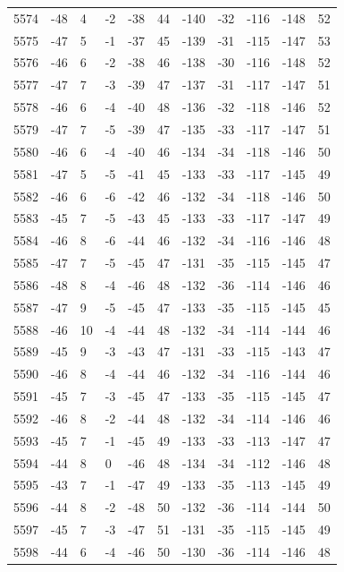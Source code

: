 \begin{table}[H]
\begin{tabular}{lllllllllll}
5574 & -48 & 4 & -2 & -38 & 44 & -140 & -32 & -116 & -148 & 52 \\
5575 & -47 & 5 & -1 & -37 & 45 & -139 & -31 & -115 & -147 & 53 \\
5576 & -46 & 6 & -2 & -38 & 46 & -138 & -30 & -116 & -148 & 52 \\
5577 & -47 & 7 & -3 & -39 & 47 & -137 & -31 & -117 & -147 & 51 \\
5578 & -46 & 6 & -4 & -40 & 48 & -136 & -32 & -118 & -146 & 52 \\
5579 & -47 & 7 & -5 & -39 & 47 & -135 & -33 & -117 & -147 & 51 \\
5580 & -46 & 6 & -4 & -40 & 46 & -134 & -34 & -118 & -146 & 50 \\
5581 & -47 & 5 & -5 & -41 & 45 & -133 & -33 & -117 & -145 & 49 \\
5582 & -46 & 6 & -6 & -42 & 46 & -132 & -34 & -118 & -146 & 50 \\
5583 & -45 & 7 & -5 & -43 & 45 & -133 & -33 & -117 & -147 & 49 \\
5584 & -46 & 8 & -6 & -44 & 46 & -132 & -34 & -116 & -146 & 48 \\
5585 & -47 & 7 & -5 & -45 & 47 & -131 & -35 & -115 & -145 & 47 \\
5586 & -48 & 8 & -4 & -46 & 48 & -132 & -36 & -114 & -146 & 46 \\
5587 & -47 & 9 & -5 & -45 & 47 & -133 & -35 & -115 & -145 & 45 \\
5588 & -46 & 10 & -4 & -44 & 48 & -132 & -34 & -114 & -144 & 46 \\
5589 & -45 & 9 & -3 & -43 & 47 & -131 & -33 & -115 & -143 & 47 \\
5590 & -46 & 8 & -4 & -44 & 46 & -132 & -34 & -116 & -144 & 46 \\
5591 & -45 & 7 & -3 & -45 & 47 & -133 & -35 & -115 & -145 & 47 \\
5592 & -46 & 8 & -2 & -44 & 48 & -132 & -34 & -114 & -146 & 46 \\
5593 & -45 & 7 & -1 & -45 & 49 & -133 & -33 & -113 & -147 & 47 \\
5594 & -44 & 8 & 0 & -46 & 48 & -134 & -34 & -112 & -146 & 48 \\
5595 & -43 & 7 & -1 & -47 & 49 & -133 & -35 & -113 & -145 & 49 \\
5596 & -44 & 8 & -2 & -48 & 50 & -132 & -36 & -114 & -144 & 50 \\
5597 & -45 & 7 & -3 & -47 & 51 & -131 & -35 & -115 & -145 & 49 \\
5598 & -44 & 6 & -4 & -46 & 50 & -130 & -36 & -114 & -146 & 48 \\

\end{tabular}
\end{table}

